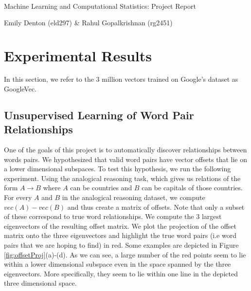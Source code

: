 \documentclass[11pt]{article}
\begin{document}
\vspace*{8cm}

\centerline{\sc \Large Machine Learning and Computational Statistics: Project Report}

\vspace{1cm}

\centerline{\sc \small Emily Denton (eld297)  \& Rahul Gopalkrishnan (rg2451)}
         
\clearpage 










\clearpage

\section{Experimental Results}
In this section, we refer to the 3 million vectors trained on Google's dataset as GoogleVec. 



\subsection{Unsupervised Learning of Word Pair Relationships}
One of the goals of this project is to automatically discover relationships between words pairs. We hypothesized that valid word pairs have vector offsets that lie on a lower dimensional subspaces. To test this hypothesis, we run the following experiment. Using the analogical reasoning task, which gives us relations of the form $A\to B$ where $A$ can be countries and $B$ can be capitals of those countries. For every $A$ and $B$ in the analogical reasoning dataset, we compute $vec(A)-vec(B)$ and thus create a matrix of offsets. Note that only a subset of these correspond to true word relationships. We compute the $3$ largest eigenvectors of the resulting offset matrix. We plot the projection of the offset matrix onto the three eigenvectors and highlight the true word pairs (i.e word pairs that we are hoping to find) in red. Some examples are depicted in Figure \ref{fig:offsetProj}(a)-(d). As we can see, a large number of the red points seem to lie within a lower dimensional subspace even in the space spanned by the three eigenvectors. More specifically, they seem to lie within one line in the depicted three dimensional space. 
\end{document}
